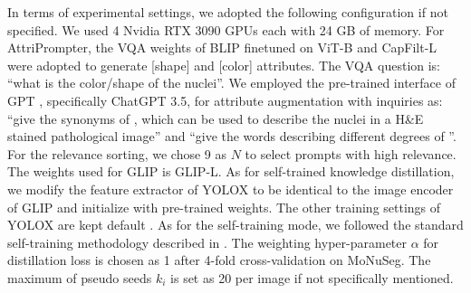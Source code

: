 \documentclass[journal,twoside,web]{ieeecolor}
\begin{document}
In terms of experimental settings, we adopted the following configuration if not specified. We used 4 Nvidia RTX 3090 GPUs each with 24 GB of memory. For AttriPrompter, the VQA weights of BLIP finetuned on ViT-B and CapFilt-L  \cite{li2022blip} were adopted to generate [shape] and [color] attributes. The VQA question is: ``what is the color/shape of the nuclei''. We employed the pre-trained interface of GPT \cite{radford2019language}, specifically ChatGPT 3.5, for attribute augmentation with inquiries as: ``give the synonyms of \textunderscore\textunderscore, which can be used to describe the nuclei in a H\&E stained pathological image'' and ``give the words describing different degrees of \textunderscore\textunderscore''. For the relevance sorting, we chose 9 as $N$ to select prompts with high relevance. The weights used for GLIP is GLIP-L. As for self-trained knowledge distillation, we modify the feature extractor of YOLOX to be identical to the image encoder of GLIP and initialize with pre-trained weights. The other training settings of YOLOX are kept default \cite{ge2021yolox}. As for the self-training mode, we followed the standard self-training methodology described in \cite{dopido2013semisupervised}. The weighting hyper-parameter $\alpha$ for distillation loss is chosen as 1 after 4-fold cross-validation on MoNuSeg. The maximum of pseudo seeds $k_i$ is set as 20 per image if not specifically mentioned.
\end{document}
